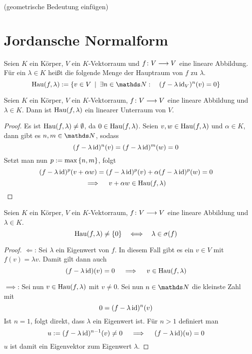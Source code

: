 		(geometrische Bedeutung einfügen)


	\section{Jordansche Normalform} %
	\label{sec:jordansche_normalform}
	
		\begin{definition}
			Seien $K$ ein Körper, $V$ ein $K$-Vektorraum und $f\colon V\longrightarrow V$ eine lineare Abbildung.
			Für ein $\lambda\in K$ heißt die folgende Menge der Hauptraum von $f$ zu $\lambda$.
			\[ \m{Hau}(f,\lambda) := \set{v\in V}{ \exists n\in\SN:\quad (f-\lambda\id_V)^n(v) = 0 } \]
		\end{definition}

		\begin{lemma}
			Seien $K$ ein Körper, $V$ ein $K$-Vektorraum, $f\colon V\longrightarrow V$ eine lineare Abbildung und $\lambda\in K$.
			Dann ist $\mathrm{Hau}(f,\lambda)$ ein linearer Unterraum von $V$.
		\end{lemma}
		\begin{proof}
			Es ist $\mathrm{Hau}(f,\lambda) \neq \emptyset$, da $0\in\mathrm{Hau}(f,\lambda)$.
			Seien $v,w\in\mathrm{Hau}(f,\lambda)$ und $\alpha\in K$, dann gibt es $n,m\in\SN$, sodass
			\[ (f-\lambda\operatorname{id})^n(v) = (f-\lambda\operatorname{id})^m(w) = 0 \]
			Setzt man nun $p:=\max\left\{ n,m \right\}$, folgt
			\[ (f-\lambda\operatorname{id})^p(v+\alpha w) = (f-\lambda\operatorname{id})^p(v) + \alpha(f-\lambda\operatorname{id})^p(w) = 0 \]
			\[ \implies \quad v+\alpha w \in \mathrm{Hau}(f,\lambda) \]
		\end{proof}

		\begin{lemma}
			Seien $K$ ein Körper, $V$ ein $K$-Vektorraum, $f\colon V\longrightarrow V$ eine lineare Abbildung und $\lambda\in K$.
			\[ \mathrm{Hau}(f,\lambda) \neq \left\{ 0 \right\} \quad \Longleftrightarrow \quad \lambda \in \sigma(f) \]
		\end{lemma}
		\begin{proof}
			$\Longleftarrow$:
			Sei $\lambda$ ein Eigenwert von $f$.
			In diesem Fall gibt es ein $v\in V$ mit $f(v)=\lambda v$.
			Damit gilt dann auch 
			\[ (f-\lambda\operatorname{id})(v) = 0 \quad \implies \quad v\in\mathrm{Hau}(f,\lambda) \]

			$\implies$:
			Sei nun $v\in\mathrm{Hau}(f,\lambda)$ mit $v\neq 0$.
			Sei nun $n\in\SN$ die kleinste Zahl mit
			\[ 0 = (f-\lambda\operatorname{id})^n(v) \]
			Ist $n=1$, folgt direkt, dass $\lambda$ ein Eigenwert ist.
			Für $n>1$ definiert man
			\[ u:= (f-\lambda\operatorname{id})^{n-1}(v) \neq 0 \quad \implies \quad (f-\lambda\operatorname{id})(u) = 0 \]
			$u$ ist damit ein Eigenvektor zum Eigenwert $\lambda$.
		\end{proof}

